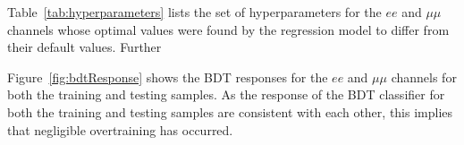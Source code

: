 Table~\ref{tab:hyperparameters} lists the set of hyperparameters for the $ee$ and $\mu\mu$ channels whose optimal values were found by the regression model to differ from their default values.
Further

\begin{table}[htbp]
\label{tab:hyperparameters}
  \centering
\end{table}

Figure~\ref{fig:bdtResponse} shows the BDT responses for the $ee$ and $\mu\mu$ channels for both the training and testing samples.
As the response of the BDT classifier for both the training and testing samples are consistent with each other, this implies that negligible overtraining has occurred. 

